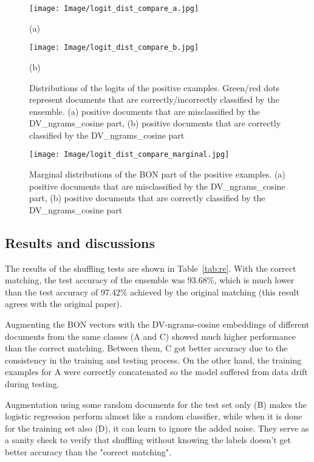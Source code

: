 \documentclass[11pt]{article}
\begin{document}
\begin{figure}[h]
    \centering \texttt{[image: Image/logit\_dist\_compare\_a.jpg]}
    
    (a)
    
    \texttt{[image: Image/logit\_dist\_compare\_b.jpg]}
    
    (b)
    
    \caption{Distributions of the logits of the positive examples. Green/red dots represent documents that are correctly/incorrectly classified by the ensemble. (a) positive documents that are misclassified by the DV\_ngrams\_cosine part, (b) positive documents that are correctly classified by the DV\_ngrams\_cosine part}
    \label{fig:logit_dist_zoom}
\end{figure}

\begin{figure}[h]
    \centering \texttt{[image: Image/logit\_dist\_compare\_marginal.jpg]}
    \caption{Marginal distributions of the BON part of the positive examples. (a) positive documents that are misclassified by the DV\_ngrams\_cosine part, (b) positive documents that are correctly classified by the DV\_ngrams\_cosine part}
    \label{fig:logit_dist_marg}
\end{figure}

\subsection{Results and discussions}
The results of the shuffling tests are shown in Table~\ref{tab:re}. With the correct matching, the test accuracy of the ensemble was 93.68\%, which is much lower than the test accuracy of 97.42\% achieved by the original matching (this result agrees with the original paper).

Augmenting the BON vectors with the DV-ngrams-cosine embeddings of different documents from the same classes (A and C) showed much higher performance than the correct matching. Between them, C got better accuracy due to the consistency in the training and testing process. On the other hand, the training examples for A were correctly concatenated so the model suffered from data drift during testing.

Augmentation using some random documents for the test set only (B) makes the logistic regression perform almost like a random classifier, while when it is done for the training set also (D), it can learn to ignore the added noise. They serve as a sanity check to verify that shuffling without knowing the labels doesn't get better accuracy than the "correct matching".
\end{document}
